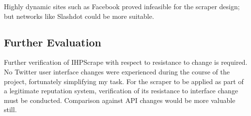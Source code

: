 Highly dynamic sites such as Facebook proved infeasible for the scraper design; but networks like Slashdot could be more suitable. 



\subsection{Further Evaluation}

Further verification of IHPScrape with respect to resistance to change is required. No Twitter user interface changes were experienced during the course of the project, fortunately simplifying my task. For the scraper to be applied as part of a legitimate reputation system, verification of its resistance to interface change must be conducted. Comparison against API changes would be more valuable still.

